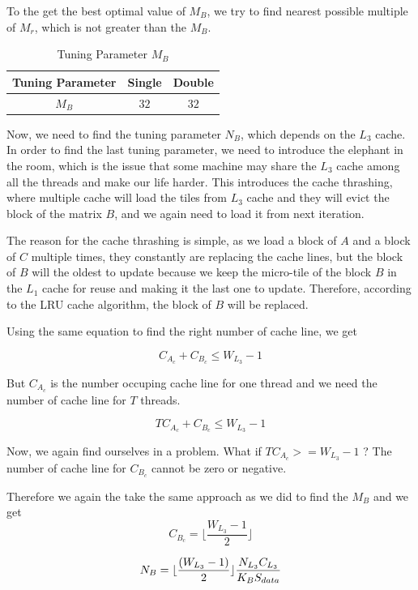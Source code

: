 To the get the best optimal value of $M_B$, we try to find nearest possible 
multiple of $M_r$, which is not greater than the $M_B$.

\begin{table}[ht]
    \centering
    \caption{Tuning Parameter $M_B$}
    \begin{tabular}{|c|c|c|}
        \hline
        \textbf{Tuning Parameter} & \textbf{Single} & \textbf{Double}\\
        \hline
        $M_B$   & $32$ & $32$ \\
        \hline
    \end{tabular}
\end{table}

Now, we need to find the tuning parameter $N_B$, which depends on the $L_3$ cache. In order
to find the last tuning parameter, we need to introduce the elephant in the room, which is
the issue that some machine may share the $L_3$ cache among all the threads and make our
life harder. This introduces the cache thrashing, where multiple cache will load the 
tiles from $L_3$ cache and they will evict the block of the matrix $B$, and we again need
to load it from next iteration.

The reason for the cache thrashing is simple, as we load a block of $A$ and a block 
of $C$ multiple times, they constantly are replacing the cache lines, but the block 
of $B$ will the oldest to update because we keep the micro-tile of the block $B$ in 
the $L_1$ cache for reuse and making it the last one to update. 
Therefore, according to the LRU cache algorithm, the block of $B$ will be replaced.

Using the same equation to find the right number of cache line, we get

\[C_{A_c} + C_{B_c} \leq W_{L_3} - 1\]

But $C_{A_c}$ is the number occuping cache line for one thread and we need the number
of cache line for $T$ threads.

\[TC_{A_c} + C_{B_c} \leq W_{L_3} - 1\]

Now, we again find ourselves in a problem. What if $TC_{A_c} >= W_{L_3} - 1$ ? The number of
cache line for $C_{B_c}$ cannot be zero or negative.

Therefore we again the take the same approach as we did to find the $M_B$ and we get
\[C_{B_c} = \lfloor \frac{ W_{L_3} - 1 }{2} \rfloor \]

\[
    N_B = \lfloor \frac{(W_{L_3} - 1)}{2} \rfloor \frac{N_{L_3} C_{L_3}}{K_B S_{data}}\\
\]


